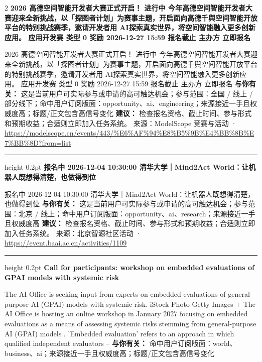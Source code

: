 \documentclass[10.5pt]{ctexart}
\begin{document}
\begin{multicols}{2}
{\large\bfseries 2026 高德空间智能开发者大赛正式开启！ 进行中 今年高德空间智能开发者大赛迎来全新挑战，以「探图者计划」为赛事主题，开启面向高德千舆空间智能开放平台的特别挑战赛季，邀请开发者用 AI探索真实世界，将空间智能融入更多创新应用。 应用开发赛 类型 0 奖励 2026-12-27 15:59 报名截止 主办方 立即报名}\par
2026 高德空间智能开发者大赛正式开启！ 进行中 今年高德空间智能开发者大赛迎来全新挑战，以「探图者计划」为赛事主题，开启面向高德千舆空间智能开放平台的特别挑战赛季，邀请开发者用 AI探索真实世界，将空间智能融入更多创新应用。 应用开发赛 类型 0 奖励 2026-12-27 15:59 报名截止 主办方 立即报名
\textbf{与你有关：} 这是当前用户可实际参与或申请的高可触达机会；参与范围：全国 / 线上 / 部分线下；命中用户订阅版面：opportunity、ai、engineering；来源接近一手且权威度高；标题/正文包含高信号变化
\textbf{建议：} 检查报名资格、截止时间、参与形式和预期收益；合适则立即加入任务系统。
{\footnotesize\color{ormuted} 来源：ModelScope 竞赛与活动 · \url{https://modelscope.cn/events/443/%E6%AF%94%E8%B5%9B%E4%BB%8B%E7%BB%8D?from=list}}
\vspace{2mm}
\hrule height 0.2pt
\vspace{2mm}
{\large\bfseries 报名中 2026-12-04 10:30:00 清华大学｜Mind2Act World：让机器人既想得清楚，也做得到位}\par
报名中 2026-12-04 10:30:00 清华大学｜Mind2Act World：让机器人既想得清楚，也做得到位
\textbf{与你有关：} 这是当前用户可实际参与或申请的高可触达机会；参与范围：北京 / 线上；命中用户订阅版面：opportunity、ai、research；来源接近一手且权威度高
\textbf{建议：} 检查报名资格、截止时间、参与形式和预期收益；合适则立即加入任务系统。
{\footnotesize\color{ormuted} 来源：北京智源社区活动 · \url{https://event.baai.ac.cn/activities/1109}}
\vspace{2mm}
\hrule height 0.2pt
\vspace{2mm}
{\large\bfseries Call for participants: workshop on embedded evaluations of GPAI models with systemic risk}\par
The AI Office is seeking input from experts on embedded evaluations of general-purpose AI (GPAI) models with systemic risk. iStock Photo Getty Images + The AI Office is hosting an online workshop in January 2027 focusing on embedded evaluations as a means of assessing systemic risks stemming from general-purpose AI (GPAI) models . 'Embedded evaluation' refers to an approach in which qualified independent evaluators –
\textbf{与你有关：} 命中用户订阅版面：world、business、ai；来源接近一手且权威度高；标题/正文包含高信号变化

\end{multicols}
\end{document}
